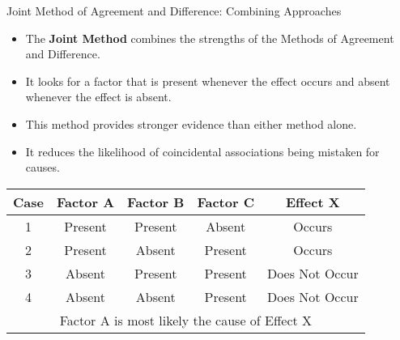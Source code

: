 \documentclass{beamer}
\begin{document}
\begin{frame}{Joint Method of Agreement and Difference: Combining Approaches}
    \begin{itemize}
        \item The \textbf{Joint Method} combines the strengths of the Methods of Agreement and Difference.
        \item It looks for a factor that is present whenever the effect occurs and absent whenever the effect is absent.
        \item This method provides stronger evidence than either method alone.
        \item It reduces the likelihood of coincidental associations being mistaken for causes.
    \end{itemize}
    
    \begin{table}
        \centering
        \begin{tabular}{|c|c|c|c|c|}
            \hline
            \textbf{Case} & \textbf{Factor A} & \textbf{Factor B} & \textbf{Factor C} & \textbf{Effect X} \\
            \hline
            1 & Present & Present & Absent & Occurs \\
            2 & Present & Absent & Present & Occurs \\
            3 & Absent & Present & Present & Does Not Occur \\
            4 & Absent & Absent & Present & Does Not Occur \\
            \hline
            \multicolumn{5}{|c|}{Factor A is most likely the cause of Effect X} \\
            \hline
        \end{tabular}
    \end{table}
\end{frame}
\end{document}
